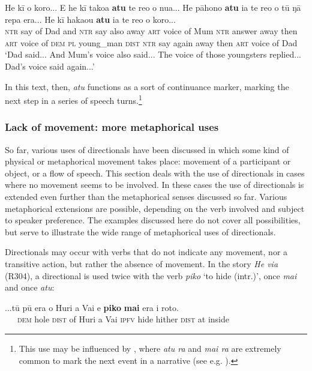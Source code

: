 \ea\label{ex:7.142}
\gll He kī o koro... {\ꞌ}E he kī tako{\ꞌ}a \textbf{atu} te re{\ꞌ}o o nua... He pāhono  \textbf{atu} ia te re{\ꞌ}o o tū ŋā repa era... He kī haka{\ꞌ}ou \textbf{atu} ia te re{\ꞌ}o o koro...\\
\textsc{ntr} say of Dad and \textsc{ntr} say also away \textsc{art} voice of Mum \textsc{ntr} answer  away then \textsc{art} voice of \textsc{dem} \textsc{pl} young\_man \textsc{dist} \textsc{ntr} say again away then \textsc{art} voice of Dad\\

\glt
‘Dad said... And Mum’s voice also said... The voice of those youngsters replied... Dad’s voice said again...’ \textstyleExampleref{[R313.009–015]}
\z

In this text, then, \textit{atu} functions as a sort of continuance marker, marking the next step in a series of speech turns.\footnote{\label{fn:356}This use may be influenced by , where \textit{atu ra} and \textit{mai ra} are extremely common to mark the next event in a narrative (see e.g. \citealt[134]{LazardPeltzer2000}).} 

\subsubsection[Lack of movement: more metaphorical uses]{Lack of movement: more metaphorical uses}\label{sec:7.5.1.4}

So far, various uses of directionals have been discussed in which some kind of physical or metaphorical movement takes place: movement of a participant or object, or a flow of speech. This section deals with the use of directionals in cases where no movement seems to be involved. In these cases the use of directionals is extended even further than the metaphorical senses discussed so far. Various metaphorical extensions are possible, depending on the verb involved and subject to speaker preference. The examples discussed here do not cover all possibilities, but serve to illustrate the wide range of metaphorical uses of directionals.

Directionals may occur with verbs that do not indicate any movement, nor a transitive action, but rather the absence of movement. In the story \textit{He via} (R304), a directional is used twice with the verb \textit{piko} ‘to hide (intr.)’, once \textit{mai} and once \textit{atu}:

\ea\label{ex:7.143}
\gll ...tū pū era o Huri {\ꞌ}a Vai e \textbf{piko} \textbf{mai} era {\ꞌ}i roto. \\
~~~\textsc{dem} hole \textsc{dist} of Huri a Vai \textsc{ipfv} hide hither \textsc{dist} at inside \\

